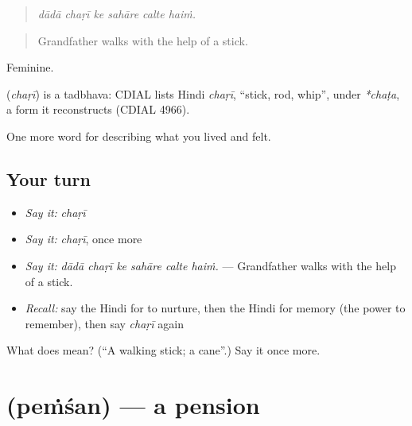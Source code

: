 \begin{quote}
     
\end{quote}

\begin{quote}
\emph{dādā chaṛī ke sahāre calte haiṁ.}
\end{quote}

\begin{quote}
Grandfather walks with the help of a stick.
\end{quote}

Feminine.

\begin{cousinweb}
\textbf{} (\emph{chaṛī}) is a tadbhava: CDIAL lists Hindi \emph{chaṛī}, \textquotedblleft{}stick, rod, whip\textquotedblright{}, under \emph{*chaṭa}, a form it reconstructs (CDIAL 4966).
\end{cousinweb}

\begin{grammarlens}[title={What you've built}]
One more word for describing what you lived and felt.
\end{grammarlens}

\subsection*{Your turn}
\begin{itemize}
\raggedright
  \item \emph{Say it:} \emph{chaṛī}
  \item \emph{Say it:} \emph{chaṛī}, once more
  \item \emph{Say it:} \emph{dādā chaṛī ke sahāre calte haiṁ.} — Grandfather walks with the help of a stick.
  \item \emph{Recall:} say the Hindi for to nurture, then the Hindi for memory (the power to remember), then say \emph{chaṛī} again
\end{itemize}

\begin{tcolorbox}[breakable,colback=teal!4,colframe=teal!35!black,title={Before you move on}]
What does  mean? (\textquotedblleft{}A walking stick; a cane\textquotedblright{}.) Say it once more.
\end{tcolorbox}
\section[\texorpdfstring{\hi{पेंशन} (peṁśan)}{पेंशन (peṁśan)}]{ (peṁśan) — a pension}

